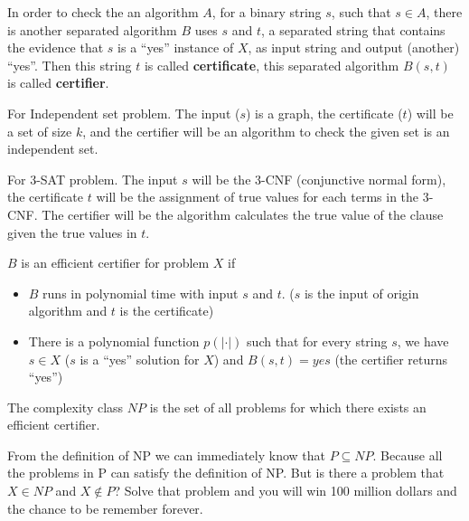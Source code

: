 				\begin{definition}
					In order to check the an algorithm $A$, for a binary string $s$, such that $s \in A$, there is another separated algorithm $B$ uses $s$ and $t$, a separated string that contains the evidence that $s$ is a ``yes'' instance of $X$, as input string and output (another) ``yes''. Then this string $t$ is called \textbf{certificate}, this separated algorithm $B(s, t)$ is called \textbf{certifier}. 
				\end{definition}


				\begin{example}
					For Independent set problem. The input ($s$) is a graph, the certificate ($t$) will be a set of size $k$, and the certifier will be an algorithm to check the given set is an independent set.
				\end{example}

				\begin{example}
					For 3-SAT problem. The input $s$ will be the 3-CNF (conjunctive normal form), the certificate $t$ will be the assignment of true values for each terms in the 3-CNF. The certifier will be the algorithm calculates the true value of the clause given the true values in $t$.
				\end{example}

				\begin{definition}
					$B$ is an efficient certifier for problem $X$ if
					\begin{itemize}
						\item $B$ runs in polynomial time with input $s$ and $t$. ($s$ is the input of origin algorithm and $t$ is the certificate)
						\item There is a polynomial function $p(|\cdot|)$ such that for every string $s$, we have $s \in X$ ($s$ is a ``yes'' solution for $X$) and $B(s, t) = yes$ (the certifier returns ``yes'')
					\end{itemize}
				\end{definition}

				\begin{definition}[NP]
					The complexity class $NP$ is the set of all problems for which there exists an efficient certifier.
				\end{definition}

				From the definition of NP we can immediately know that $P \subseteq NP$. Because all the problems in P can satisfy the definition of NP. But is there a problem that $X \in NP$ and $X \notin P$? Solve that problem and you will win 100 million dollars and the chance to be remember forever.

